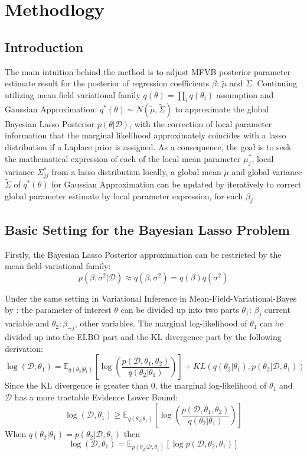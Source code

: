 \chapter{Methodlogy}
\label{Chapter3}
\section{Introduction}
The main intuition behind the method is to adjust MFVB posterior parameter estimate result for the posterior of regression coefficients $\beta$: $\tilde{\mu}$ and $\tilde{\Sigma}$. Continuing utilizing mean field variational family $q(\theta) = \prod_i q(\theta_i)$ assumption and Gaussian Approximation: $q^*(\theta) \sim N(\tilde{\mu},\tilde{\Sigma})$  to approximate the global Bayesian Lasso Posterior $p(\theta|\mathcal{D})$, with the correction of local parameter information that the marginal likelihood approximately coincides with a lasso distribution if a Laplace prior is assigned. As a consequence, the goal is to seek the mathematical expression of each of the local mean parameter $\mu_j^{*}$, local variance $\Sigma_{jj}^{*}$ from a lasso distribution locally, a global mean $\tilde{\mu}$ and global variance $\tilde{\Sigma}$ of $q^*(\theta)$ for Gaussian Approximation can be updated by iteratively to correct global parameter estimate by local parameter expression, for each $\beta_j$.


\section{Basic Setting for the Bayesian Lasso Problem}
Firstly, the Bayesian Lasso Posterior approximation can be restricted by the mean field variational family:
\begin{equation}
	\label{eq:assum}
	p(\beta,\sigma^2|\mathcal{D})\approx q(\beta,\sigma^2) = q(\beta)q(\sigma^2)
\end{equation}

Under the same setting in Variational Inference in Mean-Field-Variational-Bayes by \cite{Ormerod2010ExplainingVA}:
the parameter of interest $\theta$ can be divided up into two parts $\theta_1$: $\beta_j$ current variable and $\theta_{2}: \beta_{-j}$, other variables. The marginal log-likelihood of $\theta_1$ can be divided up into the ELBO part and the KL divergence part by the following derivation:
\begin{equation}
	\label{LocalGlobalVI}
	\log(\mathcal{D},\theta_1) = \mathbb{E}_{q(\theta_{2}|\theta_1)}[\log(\frac{p(\mathcal{D},\theta_1,\theta_{2})}{q(\theta_{2}|\theta_1)})] + KL(q(\theta_{2}|\theta_1),p(\theta_{2}|\mathcal{D},\theta_1))
\end{equation}
Since the KL divergence is greater than 0, the marginal log-likelihood of $\theta_1$ and $\mathcal{D}$ has a more tractable Evidence Lower Bound: 
\begin{equation}
	\log(\mathcal{D},\theta_1) \geq \mathbb{E}_{q(\theta_{2}|\theta_1)}[\log(\frac{p(\mathcal{D},\theta_1,\theta_{2})}{q(\theta_{2}|\theta_1)})]
\end{equation}
When $q(\theta_{2}|\theta_1) = p(\theta_{2}|\mathcal{D},\theta_1)$ then 
$$
\log(\mathcal{D},\theta_1) = \mathbb{E}_{p(\theta_{2}|\mathcal{D},\theta_1)}[\log p(\mathcal{D},\theta_2,\theta_{1})]
$$


